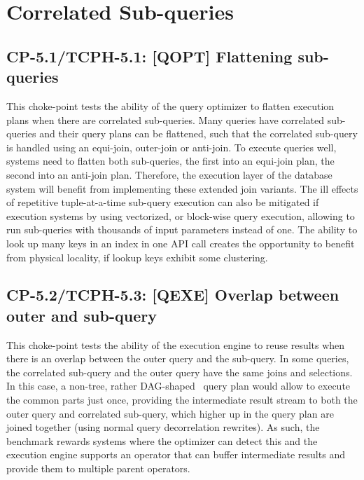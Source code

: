 
%

\section{Correlated Sub-queries}

\subsection*{CP-5.1/TCPH-5.1: [QOPT]  Flattening sub-queries}
\label{choke_point_5.1}
This choke-point tests the ability of the query optimizer to flatten execution plans when there are correlated sub-queries. Many queries have correlated sub-queries and their query plans can be flattened,
such that the correlated sub-query is handled using an equi-join, outer-join or anti-join. To execute queries well, systems need to flatten both sub-queries, the first into an equi-join plan, the second into an anti-join plan.
Therefore, the execution layer of the database system will benefit from implementing these extended join variants.
The ill effects of repetitive tuple-at-a-time sub-query execution can also be mitigated if execution systems by using vectorized, or block-wise query execution, allowing to run sub-queries with thousands of input parameters instead of one.
The ability to look up many keys in an index in one API call creates the opportunity to benefit from physical locality, if lookup keys exhibit some clustering.



\subsection*{CP-5.2/TCPH-5.3: [QEXE] Overlap between outer and sub-query}
\label{choke_point_5.2}
This choke-point tests the ability of the execution engine to reuse results when there is an overlap between the outer query and the sub-query. In some queries, the correlated sub-query and the outer query have the same joins and selections.
In this case, a non-tree, rather DAG-shaped~\cite{DBLP:conf/btw/NeumannM09} query plan would allow to execute the common parts just once, providing the intermediate result stream to both the outer query and correlated sub-query,
which higher up in the query plan are joined together (using normal query decorrelation rewrites).
As such, the benchmark rewards systems where the optimizer can detect this and the execution engine supports an operator that can buffer intermediate results and provide them to multiple parent operators.

